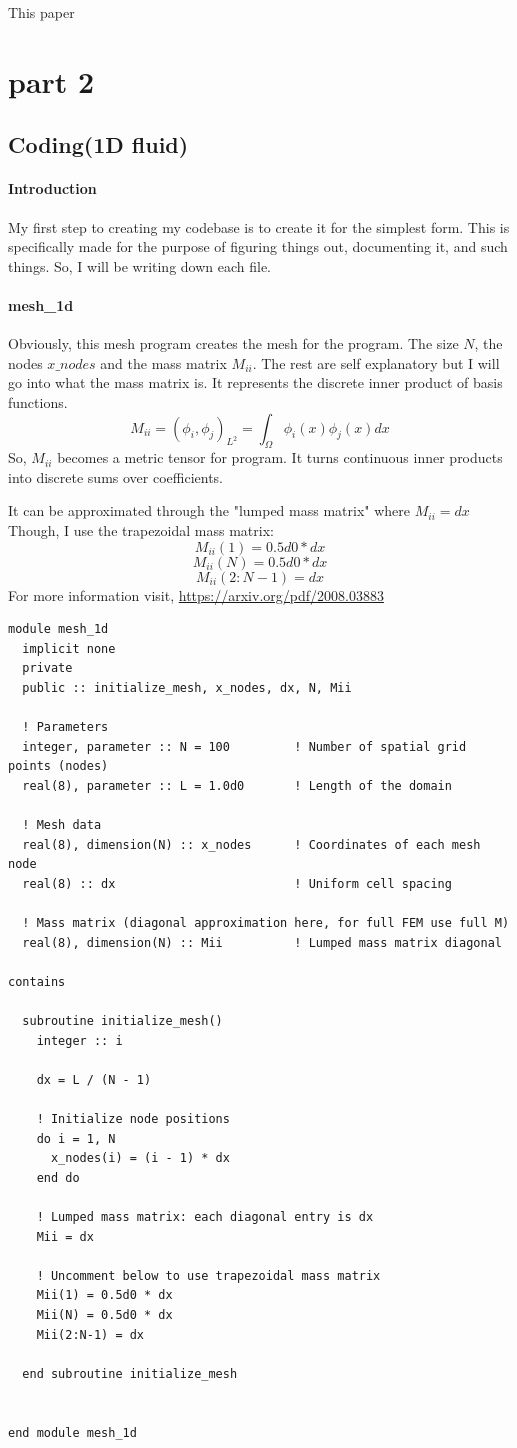 
 This paper
\section{part 2}
\subsection{Coding(1D fluid)}
\paragraph{Introduction}
My first step to creating my codebase is to create it for the simplest form. This is specifically made for the purpose of figuring things out, documenting it, and such things. So, I will be writing down each file.

\paragraph{mesh\_1d}
Obviously, this mesh program creates the mesh for the program. The size $N$, the nodes $x\_nodes$ and the mass matrix $M_{ii}$. The rest are self explanatory but I will go into what the mass matrix is. It represents the discrete inner product of basis functions.
$$M_{ii}=(\phi_i,\phi_j)_{L^2}=\int_\Omega \phi_i(x)\phi_j(x)dx$$
So, $M_{ii} $ becomes a metric tensor for program. It turns continuous inner products into discrete sums over coefficients.

It can be approximated through the "lumped mass matrix" where $M_{ii}=dx$
Though, I use the trapezoidal mass matrix:
$$M_{ii}(1) = 0.5d0 * dx $$
$$ M_{ii}(N) = 0.5d0 * dx$$
$$M_{ii}(2:N-1) = dx$$
For more information visit, \url{https://arxiv.org/pdf/2008.03883}
\begin{lstlisting}[style=FORTRAN, caption=mesh\_1d.f90]
module mesh_1d
  implicit none
  private
  public :: initialize_mesh, x_nodes, dx, N, Mii

  ! Parameters
  integer, parameter :: N = 100         ! Number of spatial grid points (nodes)
  real(8), parameter :: L = 1.0d0       ! Length of the domain

  ! Mesh data
  real(8), dimension(N) :: x_nodes      ! Coordinates of each mesh node
  real(8) :: dx                         ! Uniform cell spacing

  ! Mass matrix (diagonal approximation here, for full FEM use full M)
  real(8), dimension(N) :: Mii          ! Lumped mass matrix diagonal

contains

  subroutine initialize_mesh()
    integer :: i

    dx = L / (N - 1)

    ! Initialize node positions
    do i = 1, N
      x_nodes(i) = (i - 1) * dx
    end do

    ! Lumped mass matrix: each diagonal entry is dx
    Mii = dx

    ! Uncomment below to use trapezoidal mass matrix
    Mii(1) = 0.5d0 * dx
    Mii(N) = 0.5d0 * dx
    Mii(2:N-1) = dx

  end subroutine initialize_mesh


end module mesh_1d 
\end{lstlisting}


